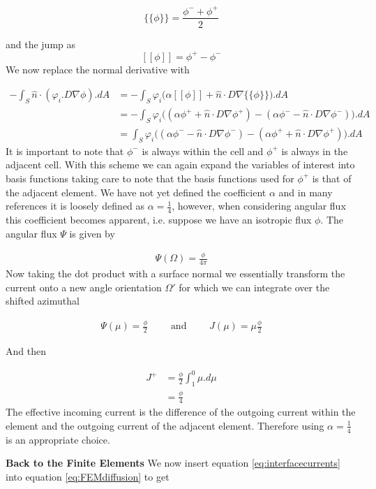 \documentclass[11pt,letterpaper,titlepage]{article}
\numberwithin{equation}{section}
\newcommand{\beq}{\begin{equation*}
\begin{aligned}}
\newcommand{\eeq}{\end{aligned}
\end{equation*}}
\newcommand{\beqn}{\begin{equation}
	\begin{aligned}}
\newcommand{\eeqn}{\end{aligned}
	\end{equation}}
\begin{document}
$$
\{\{ \phi  \}\} = \frac{\phi^- + \phi^+}{2}
$$

and the jump as 
$$
[[ \phi ]] = \phi^+ - \phi^-
$$
\newline
We now replace the normal derivative with

\beqn \label{eq:interfacecurrents}
-\int_S \hat{n} \cdot (\varphi_i. D \nabla \phi).dA  
&=-\int_S \varphi_i \biggr( \alpha [[ \phi ]] + \hat{n}\cdot D \nabla \{\{ \phi  \}\} \biggr).dA \\
&=-\int_S \varphi_i \biggr( 
(\alpha \phi^+ + \hat{n}\cdot D \nabla \phi^+) 
 -(\alpha \phi^- - \hat{n}\cdot D \nabla \phi^-)
\biggr).dA \\
&=\int_S \varphi_i \biggr( 
(\alpha \phi^- - \hat{n}\cdot D \nabla \phi^-)
-(\alpha \phi^+ + \hat{n}\cdot D \nabla \phi^+) 
\biggr).dA
\eeqn
\newline
It is important to note that $\phi^-$ is always within the cell and $\phi^+$ is always in the adjacent cell. With this scheme we can again expand the variables of interest into basis functions taking care to note that the basis functions used for $\phi^+$ is that of the adjacent element. We have not yet defined the coefficient $\alpha$ and in many references it is loosely defined as $\alpha=\frac{1}{4}$, however, when considering angular flux this coefficient becomes apparent, i.e. suppose we have an isotropic flux $\phi$. The angular flux $\Psi$ is given by

\beq 
\Psi(\Omega)= \frac{\phi}{4\pi}
\eeq 
\newline
Now taking the dot product with a surface normal we essentially transform the current onto a new angle orientation $\Omega'$ for which we can integrate over the shifted azimuthal

\beq 
\Psi(\mu)= \frac{\phi}{2} 
\quad \quad \text{ and } \quad \quad
J(\mu) =  \mu \frac{\phi}{2}
\eeq 

And then 

\beq
J^{+} &= \frac{\phi}{2} \int_{1}^{0} \mu.d\mu \\
&=\frac{\phi}{4}
\eeq
\newline
The effective incoming current is the difference of the outgoing current within the element and the outgoing current of the adjacent element. Therefore using $\alpha=\frac{1}{4}$ is an appropriate choice.

\vspace{0.5cm}
\textbf{Back to the Finite Elements} \newline
We now insert equation \ref{eq:interfacecurrents} into equation \ref{eq:FEMdiffusion} to get
\end{document}
